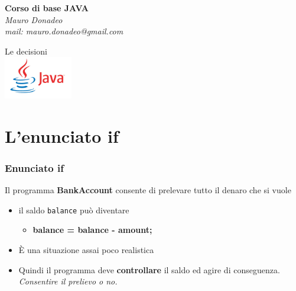 \begin{frame}
	\begin{block}{}
		\begin{center}
			{\large\textbf{Corso di base JAVA}}\\
			\itshape{Mauro Donadeo}\\
			mail: mauro.donadeo@gmail.com
		\end{center}
	\end{block}
	\begin{block}{}	
		\begin{center}
			\large{Le decisioni}\\
			\includegraphics[width = 30mm]{images/java-logo.jpg}
		\end{center}
	\end{block}	
\end{frame}

\section*{L'enunciato if}
\begin{frame}
\frametitle{Enunciato if}
\begin{block}{}
Il programma \textbf{BankAccount} consente di prelevare tutto il denaro che si vuole
\begin{itemize}
\item il saldo \texttt{balance} può diventare \textbf{}
\begin{itemize}
\item \textbf{balance = balance - amount;}
\end{itemize}
\item \`E una situazione assai poco realistica
\item Quindi il programma deve \textbf{\alert{controllare}} il saldo ed agire di conseguenza. \textit{Consentire il prelievo o no.}
\end{itemize}
\end{block}
\end{frame}

